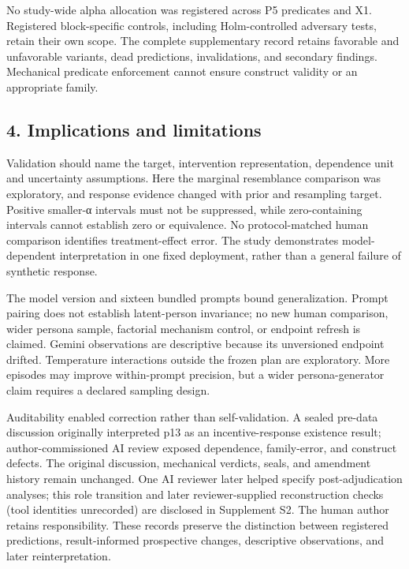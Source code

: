 \documentclass[11pt]{article}
\begin{document}
No study-wide alpha allocation was registered across P5 predicates and
X1. Registered block-specific controls, including Holm-controlled
adversary tests, retain their own scope. The complete supplementary
record retains favorable and unfavorable variants, dead predictions,
invalidations, and secondary findings. Mechanical predicate enforcement
cannot ensure construct validity or an appropriate family.

\subsection{4. Implications and
limitations}\label{implications-and-limitations}

Validation should name the target, intervention representation,
dependence unit and uncertainty assumptions. Here the marginal
resemblance comparison was exploratory, and response evidence changed
with prior and resampling target. Positive smaller-α intervals must not
be suppressed, while zero-containing intervals cannot establish zero or
equivalence. No protocol-matched human comparison identifies
treatment-effect error. The study demonstrates model-dependent
interpretation in one fixed deployment, rather than a general failure of
synthetic response.

The model version and sixteen bundled prompts bound generalization.
Prompt pairing does not establish latent-person invariance; no new human
comparison, wider persona sample, factorial mechanism control, or
endpoint refresh is claimed. Gemini observations are descriptive because
its unversioned endpoint drifted. Temperature interactions outside the
frozen plan are exploratory. More episodes may improve within-prompt
precision, but a wider persona-generator claim requires a declared
sampling design.

Auditability enabled correction rather than self-validation. A sealed
pre-data discussion originally interpreted p13 as an incentive-response
existence result; author-commissioned AI review exposed dependence,
family-error, and construct defects. The original discussion, mechanical
verdicts, seals, and amendment history remain unchanged. One AI reviewer
later helped specify post-adjudication analyses; this role transition
and later reviewer-supplied reconstruction checks (tool identities
unrecorded) are disclosed in Supplement S2. The human author retains
responsibility. These records preserve the distinction between
registered predictions, result-informed prospective changes, descriptive
observations, and later reinterpretation.
\end{document}
